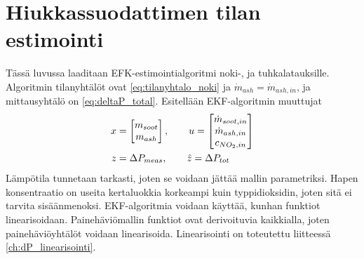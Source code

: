 \chapter{Hiukkassuodattimen tilan estimointi}%
\label{ch:dpf_estimointi}


Tässä luvussa laaditaan EFK-estimointialgoritmi noki-, ja tuhkalatauksille. Algoritmin tilanyhtälöt ovat \eqref{eq:tilanyhtalo_noki} ja \(\dot{m}_{ash} =\dot{m}_{ash,in}\), ja mittausyhtälö on \eqref{eq:deltaP_total}. 
Esitellään EKF-algoritmin muuttujat
\begin{align*}
    x &= \begin{bmatrix} m_{soot} \\ m_{ash} \end{bmatrix},  
    \qquad  u = \begin{bmatrix}  \dot{m}_{soot, in} \\ \dot{m}_{ash,in} \\ c_{NO_2, in} \end{bmatrix} 
    \\
    z &= \Delta P_{meas},
    \qquad \hat{z} =  \Delta P_{tot} \\
\end{align*}
Lämpötila tunnetaan tarkasti, joten se voidaan jättää mallin parametriksi. Hapen konsentraatio on useita kertaluokkia korkeampi kuin typpidioksidin, joten sitä ei tarvita sisäänmenoksi. 
EKF-algoritmia voidaan käyttää, kunhan funktiot linearisoidaan. 
Painehäviömallin funktiot ovat derivoituvia kaikkialla, joten painehäviöyhtälöt voidaan linearisoida.
Linearisointi on toteutettu liitteessä \ref{ch:dP_linearisointi}.